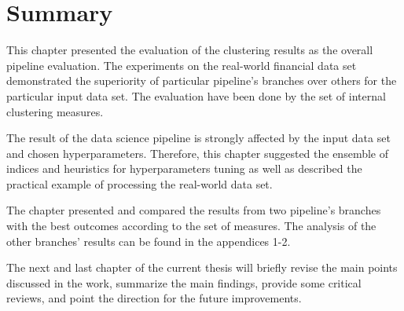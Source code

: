 \section{Summary}
This chapter presented the evaluation of the clustering results as the overall pipeline evaluation. The experiments on the real-world financial data set demonstrated the superiority of particular pipeline's branches over others for the particular input data set. The evaluation have been done by the set of internal clustering measures.

The result of the data science pipeline is strongly affected by the input data set and chosen hyperparameters. Therefore, this chapter suggested the ensemble of indices and heuristics for hyperparameters tuning as well as described the practical example of processing the real-world data set.

The chapter presented and compared the results from two pipeline's branches with the best outcomes according to the set of measures. The analysis of the other branches' results can be found in the appendices 1-2.

The next and last chapter of the current thesis will briefly revise the main points discussed in the work, summarize the main findings, provide some critical reviews, and point the direction for the future improvements.